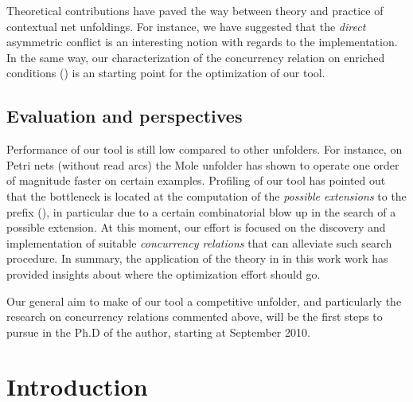 \documentclass[11pt,a4paper]{article}
\begin{document}
Theoretical contributions have paved the way between theory and practice of
contextual net unfoldings.  For instance, we have suggested that the
\emph{direct} asymmetric conflict is an interesting notion with regards to the
implementation.  In the same way, our characterization of the concurrency
relation on enriched conditions () is an starting point for
the optimization of our tool.

\subsection*{Evaluation and perspectives}

Performance of our tool is still low compared to other unfolders.  For
instance, on Petri nets (without read arcs) the Mole unfolder  has
shown to operate one order of magnitude faster on certain examples.  Profiling
of our tool has pointed out that the bottleneck is located at the computation
of the \emph{possible extensions} to the prefix (),
in particular due to a certain combinatorial blow up in the search of a
possible extension.  At this moment, our effort is focused on the discovery and
implementation of suitable \emph{concurrency relations} that can alleviate such
search procedure.  In summary, the application of the theory in 
in this work work has provided insights about where the optimization effort
should go.

Our general aim to make of our tool a competitive unfolder, and particularly
the research on concurrency relations commented above, will be the first steps
to pursue in the Ph.D of the author, starting at September 2010.

\newpage

\section{Introduction}
\label{sec:introduction}
\end{document}
